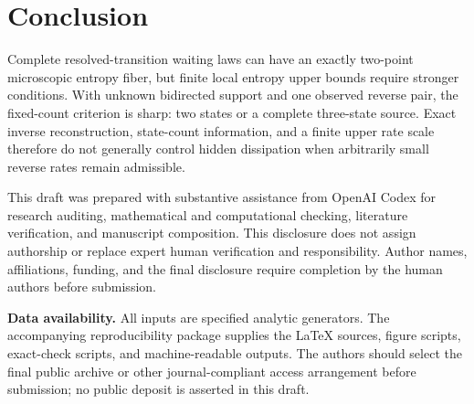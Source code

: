 \documentclass[aps,pre,onecolumn,11pt,longbibliography,notitlepage]{revtex4-2}
\newcommand{\1}{\mathbf 1}
\begin{document}
\section{Conclusion}
Complete resolved-transition waiting laws can have an exactly two-point microscopic entropy fiber, but finite local entropy upper bounds require stronger conditions. With unknown bidirected support and one observed reverse pair, the fixed-count criterion is sharp: two states or a complete three-state source. Exact inverse reconstruction, state-count information, and a finite upper rate scale therefore do not generally control hidden dissipation when arbitrarily small reverse rates remain admissible.

\begin{acknowledgments}
This draft was prepared with substantive assistance from OpenAI Codex for research auditing, mathematical and computational checking, literature verification, and manuscript composition. This disclosure does not assign authorship or replace expert human verification and responsibility. Author names, affiliations, funding, and the final disclosure require completion by the human authors before submission.
\end{acknowledgments}
\noindent\textbf{Data availability.}
All inputs are specified analytic generators. The accompanying reproducibility package supplies the LaTeX sources, figure scripts, exact-check scripts, and machine-readable outputs. The authors should select the final public archive or other journal-compliant access arrangement before submission; no public deposit is asserted in this draft.

\appendix

\raggedright

\end{document}
